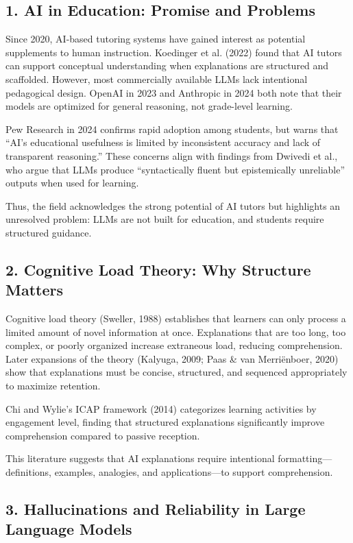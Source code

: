 \documentclass[11pt]{article}
\begin{document}
\subsection*{1. AI in Education: Promise and Problems}

Since 2020, AI-based tutoring systems have gained interest as potential
supplements to human instruction. Koedinger et al. (2022) found that AI tutors
can support conceptual understanding when explanations are structured and
scaffolded. However, most commercially available LLMs lack intentional
pedagogical design. OpenAI in 2023 and Anthropic in 2024 both note that their
models are optimized for general reasoning, not grade-level learning.

Pew Research in 2024 confirms rapid adoption among students, but warns that
``AI's educational usefulness is limited by inconsistent accuracy and lack of
transparent reasoning.'' These concerns align with findings from Dwivedi et al.,
who argue that LLMs produce ``syntactically fluent but epistemically
unreliable'' outputs when used for learning.

Thus, the field acknowledges the strong potential of AI tutors but highlights an
unresolved problem: LLMs are not built for education, and students require
structured guidance.

\subsection*{2. Cognitive Load Theory: Why Structure Matters}

Cognitive load theory (Sweller, 1988) establishes that learners can only process
a limited amount of novel information at once. Explanations that are too long,
too complex, or poorly organized increase extraneous load, reducing
comprehension. Later expansions of the theory (Kalyuga, 2009; Paas \& van
Merri\"enboer, 2020) show that explanations must be concise, structured, and
sequenced appropriately to maximize retention.

Chi and Wylie's ICAP framework (2014) categorizes learning activities by
engagement level, finding that structured explanations significantly improve
comprehension compared to passive reception.

This literature suggests that AI explanations require intentional
formatting---definitions, examples, analogies, and applications---to support
comprehension.

\subsection*{3. Hallucinations and Reliability in Large Language Models}
\end{document}
